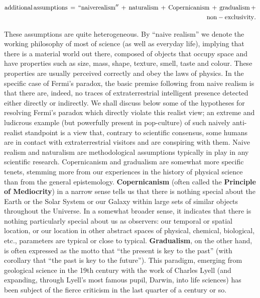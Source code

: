 \documentclass[a4paper,10pt]{article}
\begin{document}
\begin{align*}
    {\rm additional\,assumptions\,=\,``naive realism''\,+\,naturalism\,+\,Copernicanism\,+\,gradualism\,+}\\ 
    {\rm non-exclusivity.}
\end{align*}

{\noindent}These assumptions are quite heterogeneous. By ``naive realism'' we denote the working philosophy of most of science (as well as everyday life), implying that there is a material world out there, composed of objects that occupy space and have properties such as size, mass, shape, texture, smell, taste and colour. These properties are usually perceived correctly and obey the laws of physics. In the specific case of Fermi's paradox, the basic premise following from naive realism is that there are, indeed, no traces of extraterrestrial intelligent presence detected either directly or indirectly. We shall discuss below some of the hypotheses for resolving Fermi's paradox which directly violate this realist view; an extreme and ludicrous example (but powerfully present in pop-culture) of such naively anti-realist standpoint is a view that, contrary to scientific consensus, some humans are in contact with extraterrestrial visitors and are conspiring with them. Naive realism and naturalism are methodological assumptions typically in play in any scientific research. Copernicanism and gradualism are somewhat more specific tenets, stemming more from our experiences in the history of physical science than from the general epistemology. \textbf{Copernicanism} (often called the \textbf{Principle of Mediocrity}) in a narrow sense tells us that there is nothing special about the Earth or the Solar System or our Galaxy within large sets of similar objects throughout the Universe. In a somewhat broader sense, it indicates that there is nothing particularly special about us as observers: our temporal or spatial location, or our location in other abstract spaces of physical, chemical, biological, etc., parameters are typical or close to typical. \textbf{Gradualism}, on the other hand, is often expressed as the motto that ``the present is key to the past'' (with corollary that ``the past is key to the future''). This paradigm, emerging from geological science in the 19th century with the work of Charles Lyell (and expanding, through Lyell's most famous pupil, Darwin, into life sciences) has been subject of the fierce criticism in the last quarter of a century or so.
\end{document}
